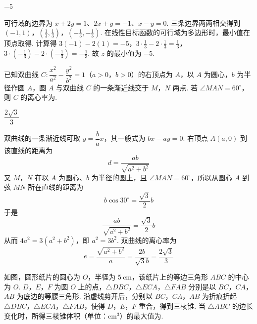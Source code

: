 \begin{answer}
\(-5\)
\end{answer}

\begin{solution}
可行域的边界为 \(x+2y=1\)、\(2x+y=-1\)、\(x-y=0\). 三条边界两两相交得到
\((-1,1)\)，\(\left(\frac13,\frac13\right)\)，\(\left(-\frac13,-\frac13\right)\).
在线性目标函数的可行域为多边形时，最小值在顶点取得. 计算得
\(3(-1)-2(1)=-5\)，\(3\cdot\frac13-2\cdot\frac13=\frac13\)，\(3\cdot\left(-\frac13\right)-2\cdot\left(-\frac13\right)=-\frac13\).
故 \(z\) 的最小值为 \(-5\).
\end{solution}

\begin{problem}
已知双曲线 \(C:\dfrac{x^2}{a^2}-\dfrac{y^2}{b^2}=1\)（\(a>0\)，\(b>0\)）的右顶点为 \(A\)，以 \(A\) 为圆心，\(b\) 为半径作圆 \(A\)，圆 \(A\) 与双曲线 \(C\) 的一条渐近线交于 \(M\)，\(N\) 两点. 若 \(\angle MAN=60^\circ\)，则 \(C\) 的离心率为\fillinblank{}.
\end{problem}

\begin{answer}
\(\dfrac{2\sqrt3}{3}\)
\end{answer}

\begin{solution}
双曲线的一条渐近线可取 \(y=\dfrac ba x\)，其一般式为 \(bx-ay=0\). 右顶点 \(A(a,0)\) 到该直线的距离为
\[
d=\frac{ab}{\sqrt{a^2+b^2}}
\]
又 \(M\)，\(N\) 在以 \(A\) 为圆心、\(b\) 为半径的圆上，且 \(\angle MAN=60^\circ\)，所以从圆心 \(A\) 到弦 \(MN\) 所在直线的距离为
\[
b\cos30^\circ=\frac{\sqrt3}{2}b
\]
于是
\[
\frac{ab}{\sqrt{a^2+b^2}}=\frac{\sqrt3}{2}b
\]
从而 \(4a^2=3(a^2+b^2)\)，即 \(a^2=3b^2\). 双曲线的离心率为
\[
e=\frac{\sqrt{a^2+b^2}}a=\frac{2b}{\sqrt3b}=\frac{2\sqrt3}{3}
\]
\end{solution}

\begin{problem}
如图，圆形纸片的圆心为 \(O\)，半径为 \(5\mathrm{~cm}\)，该纸片上的等边三角形 \(ABC\) 的中心为 \(O\). \(D\)，\(E\)，\(F\) 为圆 \(O\) 上的点，\(\triangle DBC\)，\(\triangle ECA\)，\(\triangle FAB\) 分别是以 \(BC\)，\(CA\)，\(AB\) 为底边的等腰三角形. 沿虚线剪开后，分别以 \(BC\)，\(CA\)，\(AB\) 为折痕折起 \(\triangle DBC\)，\(\triangle ECA\)，\(\triangle FAB\)，使得 \(D\)，\(E\)，\(F\) 重合，得到三棱锥. 当 \(\triangle ABC\) 的边长变化时，所得三棱锥体积（单位：\(\mathrm{cm}^3\)）的最大值为\fillinblank{}.

\end{problem}

